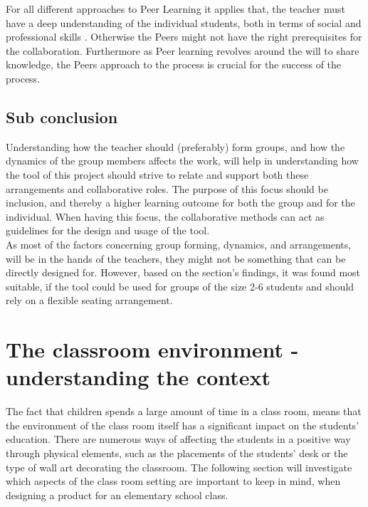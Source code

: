 For all different approaches to Peer Learning it applies that, the teacher must have a deep understanding of the individual students, both in terms of social and professional skills \cite{collaborationCompetition}. Otherwise the Peers might not have the right prerequisites for the collaboration.
Furthermore as Peer learning revolves around the will to share knowledge, the Peers approach to the process is crucial for the success of the process\cite{collaborationCompetition}.


\subsection{Sub conclusion} %
Understanding how the teacher should (preferably) form groups, and how the dynamics of the group members affects the work, will help in understanding how the tool of this project should strive to relate and support both these arrangements and collaborative roles. The purpose of this focus should be inclusion, and thereby a higher learning outcome for both the group and for the individual. 
When having this focus, the collaborative methods can act as guidelines for the design and usage of the tool.\\

As most of the factors concerning group forming, dynamics, and arrangements,  will be in the hands of the teachers, they might not be something that can be directly designed for.  
However, based on the section's findings, it was found most suitable, if the tool could be used for groups of the size 2-6 students and should rely on a flexible seating arrangement.
 

\section{The classroom environment -understanding the context} %


The fact that children spends a large amount of time in a class room, means that the environment of the class room itself has a significant impact on the students’ education. There are numerous ways of affecting the students in a positive way through physical elements, such as the placements of the students’ desk or the type of wall art decorating the classroom.\cite{classroomsetting} The following section will investigate which aspects of the class room setting are important to keep in mind, when designing a product for an elementary school class.\\

